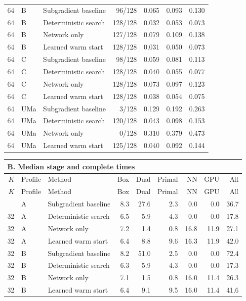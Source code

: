 \documentclass[10pt,letterpaper]{article}
\begin{document}
\begin{longtable}{rllrrrr}
64 & B & Subgradient baseline & 96/128 & 0.065 & 0.093 & 0.130\\
64 & B & Deterministic search & 128/128 & 0.032 & 0.053 & 0.073\\
64 & B & Network only & 127/128 & 0.079 & 0.109 & 0.138\\
64 & B & Learned warm start & 128/128 & 0.031 & 0.050 & 0.073\\
64 & C & Subgradient baseline & 98/128 & 0.059 & 0.081 & 0.113\\
64 & C & Deterministic search & 128/128 & 0.040 & 0.055 & 0.077\\
64 & C & Network only & 128/128 & 0.073 & 0.097 & 0.123\\
64 & C & Learned warm start & 128/128 & 0.038 & 0.054 & 0.075\\
64 & UMa & Subgradient baseline & 3/128 & 0.129 & 0.192 & 0.263\\
64 & UMa & Deterministic search & 120/128 & 0.043 & 0.098 & 0.153\\
64 & UMa & Network only & 0/128 & 0.310 & 0.379 & 0.473\\
64 & UMa & Learned warm start & 125/128 & 0.040 & 0.092 & 0.144\\\end{longtable}\addtocounter{table}{-1}\renewcommand{\theHtable}{\arabic{table}B}\begin{longtable}{rllrrrrrr}\multicolumn{9}{l}{\textbf{B. Median stage and complete times}}\\\toprule $K$ & Profile & Method & Box & Dual & Primal & NN & GPU & All\\\midrule\endfirsthead\toprule $K$ & Profile & Method & Box & Dual & Primal & NN & GPU & All\\\midrule\endhead\bottomrule\endfoot
32 & A & Subgradient baseline & 8.3 & 27.6 & 2.3 & 0.0 & 0.0 & 36.7\\
32 & A & Deterministic search & 6.5 & 5.9 & 4.3 & 0.0 & 0.0 & 17.8\\
32 & A & Network only & 7.2 & 1.4 & 0.8 & 16.8 & 11.9 & 27.1\\
32 & A & Learned warm start & 6.4 & 8.8 & 9.6 & 16.3 & 11.9 & 42.0\\
32 & B & Subgradient baseline & 8.2 & 51.0 & 2.5 & 0.0 & 0.0 & 72.4\\
32 & B & Deterministic search & 6.3 & 5.9 & 4.3 & 0.0 & 0.0 & 17.3\\
32 & B & Network only & 7.1 & 1.5 & 0.8 & 16.0 & 11.4 & 26.3\\
32 & B & Learned warm start & 6.4 & 9.1 & 9.5 & 16.0 & 11.4 & 41.6\\

\end{longtable}
\end{document}
